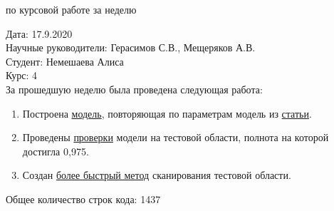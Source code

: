 \documentclass{article}
\begin{document}
\begin{center}{ по курсовой работе за неделю\\}\end{center}
Дата: 17.9.2020\\
Научные руководители: Герасимов С.В., Мещеряков А.В.\\
Студент: Немешаева Алиса\\
Курс: 4\\

\renewcommand{\labelitemi}{$\blacksquare$}
\renewcommand\labelitemii{$\square$}
За прошедшую неделю была проведена следующая работа:\\
\begin{enumerate}
    \item Построена \hyperlink{https://github.com/rt2122/data-segmentation-2/blob/master/Planck\_Unet/train\_unet\_planck\_z\_8\_filters.ipynb}{модель}, повторяющая по параметрам модель из \hyperlink{https://www.aanda.org/articles/aa/pdf/2020/02/aa36919-19.pdf}{статьи}.\\
    \item Проведены \hyperlink{https://github.com/rt2122/data-segmentation-2/blob/master/Planck\_Unet/scan\_planck\_z\_f8.ipynb}{проверки} модели на тестовой области, полнота на которой достигла 0,975.\\
    \item Создан \hyperlink{https://github.com/rt2122/data-segmentation-2/blob/master/modules/DS\_detector.py}{более быстрый метод} сканирования тестовой области.\\

\end{enumerate}

Общее количество строк кода: 1437\\
\end{document}

